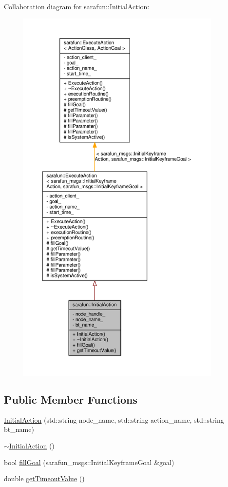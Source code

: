 Collaboration diagram for sarafun\-:\-:Initial\-Action\-:
\nopagebreak
\begin{figure}[H]
\begin{center}
\leavevmode
\includegraphics[height=550pt]{da/d64/classsarafun_1_1InitialAction__coll__graph}
\end{center}
\end{figure}
\subsection*{Public Member Functions}
\begin{DoxyCompactItemize}
\item 
\hyperlink{classsarafun_1_1InitialAction_afecd855fe18671ea36bdab881603e8bc_afecd855fe18671ea36bdab881603e8bc}{Initial\-Action} (std\-::string node\-\_\-name, std\-::string action\-\_\-name, std\-::string bt\-\_\-name)
\item 
\hyperlink{classsarafun_1_1InitialAction_af1f0a71513d093f5c2d7657b4b84661b_af1f0a71513d093f5c2d7657b4b84661b}{$\sim$\-Initial\-Action} ()
\item 
bool \hyperlink{classsarafun_1_1InitialAction_aac7f439c30455349e075e91542565a43_aac7f439c30455349e075e91542565a43}{fill\-Goal} (sarafun\-\_\-msgs\-::\-Initial\-Keyframe\-Goal \&goal)
\item 
double \hyperlink{classsarafun_1_1InitialAction_a1b58c06c32ec9f9d3e75c37de5e7d2c8_a1b58c06c32ec9f9d3e75c37de5e7d2c8}{get\-Timeout\-Value} ()
\end{DoxyCompactItemize}
